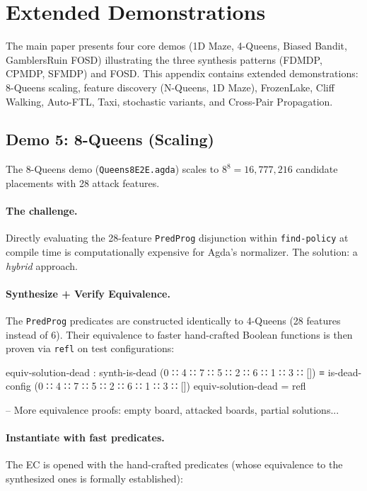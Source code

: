 
\section{Extended Demonstrations}
\label{sec:extended-demos}

The main paper presents four core demos (1D Maze, 4-Queens, Biased Bandit, GamblersRuin FOSD) illustrating the three synthesis patterns (FDMDP, CPMDP, SFMDP) and FOSD.
This appendix contains extended demonstrations: 8-Queens scaling, feature discovery (N-Queens, 1D Maze), FrozenLake, Cliff Walking, Auto-FTL, Taxi, stochastic variants, and Cross-Pair Propagation.

\subsection{Demo 5: 8-Queens (Scaling)}

The 8-Queens demo (\texttt{Queens8E2E.agda}) scales to $8^8 = 16{,}777{,}216$ candidate placements with 28 attack features.

\paragraph{The challenge.}  Directly evaluating the 28-feature \texttt{PredProg} disjunction within \texttt{find-policy} at compile time is computationally expensive for Agda's normalizer.  The solution: a \emph{hybrid} approach.

\paragraph{Synthesize + Verify Equivalence.}  The \texttt{PredProg} predicates are constructed identically to 4-Queens (28 features instead of 6).  Their equivalence to faster hand-crafted Boolean functions is then proven via \texttt{refl} on test configurations:

\begin{spec}
equiv-solution-dead :
  synth-is-dead (0 ∷ 4 ∷ 7 ∷ 5 ∷ 2 ∷ 6 ∷ 1 ∷ 3 ∷ [])
  ≡ is-dead-config (0 ∷ 4 ∷ 7 ∷ 5 ∷ 2 ∷ 6 ∷ 1 ∷ 3 ∷ [])
equiv-solution-dead = refl

-- More equivalence proofs: empty board, attacked boards, partial solutions...
\end{spec}

\paragraph{Instantiate with fast predicates.}  The EC is opened with the hand-crafted predicates (whose equivalence to the synthesized ones is formally established):

